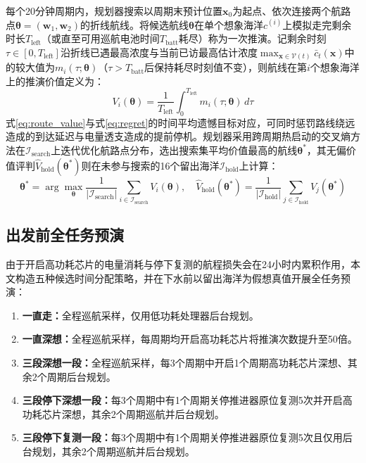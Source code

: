 每个20分钟周期内，规划器搜索以周期末预计位置$\mathbf{x}_0$为起点、依次连接两个航路点$\bm{\theta} = (\mathbf{w}_1, \mathbf{w}_2)$的折线航线。将候选航线$\bm{\theta}$在单个想象海洋$c^{(i)}$上模拟走完剩余时长$T_{\text{left}}$（或直至可用巡航电池时间$T_{\text{batt}}$耗尽）称为一次推演。记剩余时刻$\tau \in [0, T_{\text{left}}]$沿折线已遇最高浓度与当前已访最高估计浓度$\max_{\mathbf{x}\in\mathcal{V}(t)} \bar{c}_t(\mathbf{x})$中的较大值为$m_i(\tau; \bm{\theta})$（$\tau > T_{\text{batt}}$后保持耗尽时刻值不变），则航线在第$i$个想象海洋上的推演价值定义为：
\begin{equation}
  V_i(\bm{\theta}) = \frac{1}{T_{\text{left}}}\int_0^{T_{\text{left}}} m_i(\tau; \bm{\theta})\, d\tau
  \label{eq:route_value}
\end{equation}
式\eqref{eq:route_value}与式\eqref{eq:regret}的时间平均遗憾目标对应，可同时惩罚路线绕远造成的到达延迟与电量透支造成的提前停机。规划器采用跨周期热启动的交叉熵方法\cite{deboer2005cem}在$\mathcal{I}_{\text{search}}$上迭代优化航路点分布，选出搜索集平均价值最高的航线$\bm{\theta}^*$，其无偏价值评判$\hat{V}_{\text{hold}}(\bm{\theta}^*)$则在未参与搜索的16个留出海洋$\mathcal{I}_{\text{hold}}$上计算：
\begin{equation}
  \bm{\theta}^* = \arg\max_{\bm{\theta}} \frac{1}{|\mathcal{I}_{\text{search}}|}\sum_{i\in\mathcal{I}_{\text{search}}} V_i(\bm{\theta}), \quad
  \hat{V}_{\text{hold}}(\bm{\theta}^*) = \frac{1}{|\mathcal{I}_{\text{hold}}|}\sum_{j\in\mathcal{I}_{\text{hold}}} V_j(\bm{\theta}^*)
  \label{eq:split_eval}
\end{equation}

\subsection{出发前全任务预演}

由于开启高功耗芯片的电量消耗与停下复测的航程损失会在24小时内累积作用，本文构造五种候选时间分配策略，并在下水前以留出海洋为假想真值开展全任务预演：
\begin{enumerate}
  \item \textbf{一直走：}全程巡航采样，仅用低功耗处理器后台规划。
  \item \textbf{一直深想：}全程巡航采样，每周期均开启高功耗芯片将推演次数提升至50倍。
  \item \textbf{三段深想一段：}全程巡航采样，每3个周期中开启1个周期高功耗芯片深想、其余2个周期后台规划。
  \item \textbf{三段停下深想一段：}每3个周期中有1个周期关停推进器原位复测5次并开启高功耗芯片深想，其余2个周期巡航并后台规划。
  \item \textbf{三段停下复测一段：}每3个周期中有1个周期关停推进器原位复测5次且仅用后台规划，其余2个周期巡航并后台规划。
\end{enumerate}

